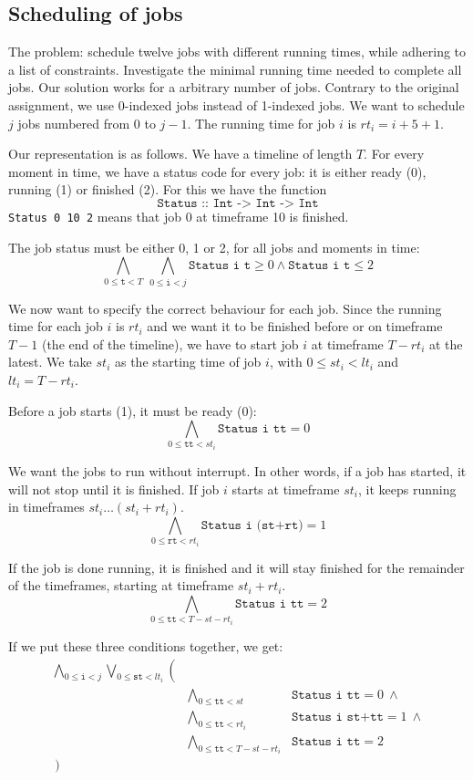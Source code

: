\documentclass[12pt]{article}
\begin{document}
\subsection*{Scheduling of jobs}
The problem: schedule twelve jobs with different running times, while adhering to a list of constraints.
Investigate the minimal running time needed to complete all jobs.
Our solution works for a arbitrary number of jobs.
Contrary to the original assignment, we use 0-indexed jobs instead of 1-indexed jobs.
We want to schedule $j$ jobs numbered from 0 to $j-1$.
The running time for job $i$ is $rt_i = i+5+1$.

Our representation is as follows.
We have a timeline of length $T$.
For every moment in time, we have a status code for every job: it is either ready (0), running (1) or finished (2). 
For this we have the function 
\[\texttt{Status :: Int -> Int -> Int}\]
\texttt{Status 0 10 2} means that job 0 at timeframe 10 is finished. 

The job status must be either 0, 1 or 2, for all jobs and moments in time:
\[ \bigwedge_{0 \le \texttt{t} < T} ~ \bigwedge_{0 \le \texttt{i} < j} \texttt{Status i t} \ge 0\wedge \texttt{Status i t} \le 2\]

We now want to specify the correct behaviour for each job. 
Since the running time for each job $i$ is $rt_i$ and we want it to be finished before or on timeframe $T-1$ (the end of the timeline), we have to start job $i$ at timeframe $T - rt_i$ at the latest.
We take $st_i$ as the starting time of job $i$, with $0 \le st_i < lt_i$ and $lt_i = T-rt_i$.

Before a job starts (1), it must be ready (0):
\[ \bigwedge_{0 \le \texttt{tt} < st_i} \texttt{Status i tt} = 0 \]

We want the jobs to run without interrupt.
In other words, if a job has started, it will not stop until it is finished. 
If job $i$ starts at timeframe $st_i$, it keeps running in timeframes $st_i \dots (st_i + rt_i)$.
\[ \bigwedge_{0 \le \texttt{rt} < rt_i} \texttt{Status i (st+rt)} = 1 \]

If the job is done running, it is finished and it will stay finished for the remainder of the timeframes, starting at timeframe $st_i + rt_i$.
\[ \bigwedge_{0 \le \texttt{tt} < T-st-rt_i} \texttt{Status i tt} = 2 \]

If we put these three conditions together, we get:
\[ \begin{array}{rll}
    \bigwedge_{0 \le \texttt{i} < j} \bigvee_{0 \le \texttt{st} < lt_i} \left( \right.&& \\
    & \bigwedge_{0 \le \texttt{tt} < st} & \texttt{Status i tt} = 0 ~ \wedge \\
    & \bigwedge_{0 \le \texttt{tt} < rt_i} & \texttt{Status i st+tt} = 1 ~ \wedge \\
    & \bigwedge_{0 \le \texttt{tt} < T-st-rt_i} & \texttt{Status i tt} = 2 \\
\left. \right)
\end{array} \]
\end{document}
